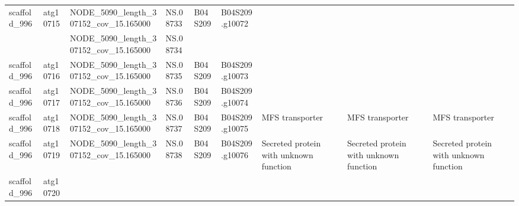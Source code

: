 \begin{longtable}{lllllllll}
   scaffold\_996 &  atg10715 &   NODE\_5090\_length\_307152\_cov\_15.165000 &              NS.08733 &      B04S209 &  B04S209.g10072 &                                                                                 &                                                                                 &                                                                                 \\
                &           &   NODE\_5090\_length\_307152\_cov\_15.165000 &              NS.08734 &              &                 &                                                                                 &                                                                                 &                                                                                 \\
   scaffold\_996 &  atg10716 &   NODE\_5090\_length\_307152\_cov\_15.165000 &              NS.08735 &      B04S209 &  B04S209.g10073 &                                                                                 &                                                                                 &                                                                                 \\
   scaffold\_996 &  atg10717 &   NODE\_5090\_length\_307152\_cov\_15.165000 &              NS.08736 &      B04S209 &  B04S209.g10074 &                                                                                 &                                                                                 &                                                                                 \\
   scaffold\_996 &  atg10718 &   NODE\_5090\_length\_307152\_cov\_15.165000 &              NS.08737 &      B04S209 &  B04S209.g10075 &                                                                 MFS transporter &                                                                 MFS transporter &                                                                 MFS transporter \\
   scaffold\_996 &  atg10719 &   NODE\_5090\_length\_307152\_cov\_15.165000 &              NS.08738 &      B04S209 &  B04S209.g10076 &                                          Secreted protein with unknown function &                                          Secreted protein with unknown function &                                          Secreted protein with unknown function \\
   scaffold\_996 &  atg10720 &                                         &                       &              &                 &                                                                                 &                                                                                 &                                                                                 \\

\end{longtable}
